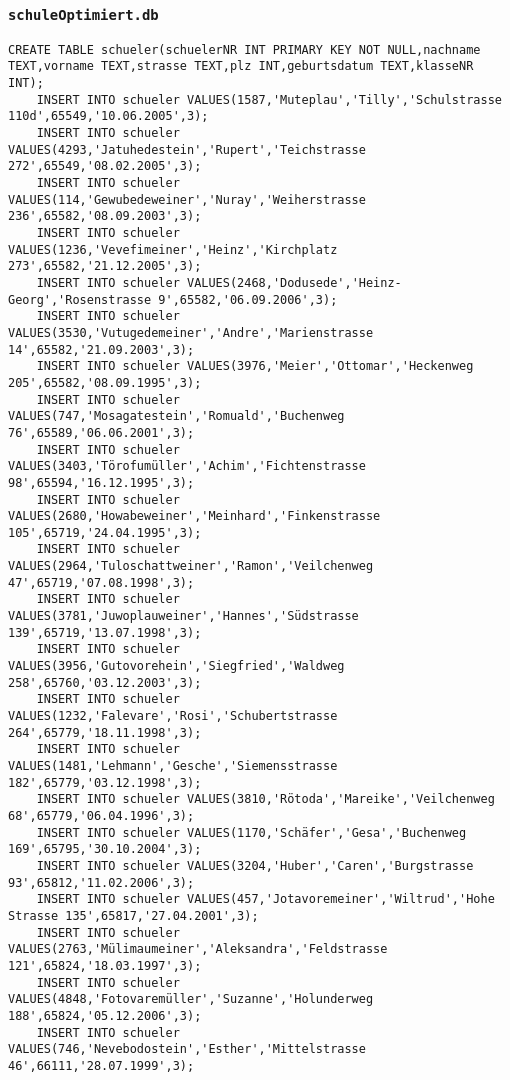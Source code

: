 \subsubsection{\lstinline!schuleOptimiert.db!}
\begin{lstlisting}[breaklines=True, numbers=none, basicstyle=\tiny, keepspaces=false]
	CREATE TABLE schueler(schuelerNR INT PRIMARY KEY NOT NULL,nachname TEXT,vorname TEXT,strasse TEXT,plz INT,geburtsdatum TEXT,klasseNR INT);
	INSERT INTO schueler VALUES(1587,'Muteplau','Tilly','Schulstrasse 110d',65549,'10.06.2005',3);
	INSERT INTO schueler VALUES(4293,'Jatuhedestein','Rupert','Teichstrasse 272',65549,'08.02.2005',3);
	INSERT INTO schueler VALUES(114,'Gewubedeweiner','Nuray','Weiherstrasse 236',65582,'08.09.2003',3);
	INSERT INTO schueler VALUES(1236,'Vevefimeiner','Heinz','Kirchplatz 273',65582,'21.12.2005',3);
	INSERT INTO schueler VALUES(2468,'Dodusede','Heinz-Georg','Rosenstrasse 9',65582,'06.09.2006',3);
	INSERT INTO schueler VALUES(3530,'Vutugedemeiner','Andre','Marienstrasse 14',65582,'21.09.2003',3);
	INSERT INTO schueler VALUES(3976,'Meier','Ottomar','Heckenweg 205',65582,'08.09.1995',3);
	INSERT INTO schueler VALUES(747,'Mosagatestein','Romuald','Buchenweg 76',65589,'06.06.2001',3);
	INSERT INTO schueler VALUES(3403,'Törofumüller','Achim','Fichtenstrasse 98',65594,'16.12.1995',3);
	INSERT INTO schueler VALUES(2680,'Howabeweiner','Meinhard','Finkenstrasse 105',65719,'24.04.1995',3);
	INSERT INTO schueler VALUES(2964,'Tuloschattweiner','Ramon','Veilchenweg 47',65719,'07.08.1998',3);
	INSERT INTO schueler VALUES(3781,'Juwoplauweiner','Hannes','Südstrasse 139',65719,'13.07.1998',3);
	INSERT INTO schueler VALUES(3956,'Gutovorehein','Siegfried','Waldweg 258',65760,'03.12.2003',3);
	INSERT INTO schueler VALUES(1232,'Falevare','Rosi','Schubertstrasse 264',65779,'18.11.1998',3);
	INSERT INTO schueler VALUES(1481,'Lehmann','Gesche','Siemensstrasse 182',65779,'03.12.1998',3);
	INSERT INTO schueler VALUES(3810,'Rötoda','Mareike','Veilchenweg 68',65779,'06.04.1996',3);
	INSERT INTO schueler VALUES(1170,'Schäfer','Gesa','Buchenweg 169',65795,'30.10.2004',3);
	INSERT INTO schueler VALUES(3204,'Huber','Caren','Burgstrasse 93',65812,'11.02.2006',3);
	INSERT INTO schueler VALUES(457,'Jotavoremeiner','Wiltrud','Hohe Strasse 135',65817,'27.04.2001',3);
	INSERT INTO schueler VALUES(2763,'Mülimaumeiner','Aleksandra','Feldstrasse 121',65824,'18.03.1997',3);
	INSERT INTO schueler VALUES(4848,'Fotovaremüller','Suzanne','Holunderweg 188',65824,'05.12.2006',3);
	INSERT INTO schueler VALUES(746,'Nevebodostein','Esther','Mittelstrasse 46',66111,'28.07.1999',3);

\end{lstlisting}
